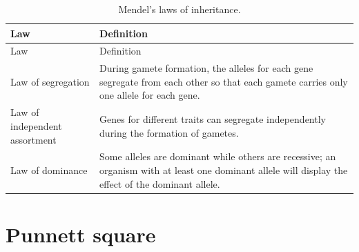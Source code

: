\documentclass[]{book}
\begin{document}
\begin{longtable}[]{@{}ll@{}}
\caption{\label{tab:mendel} Mendel's laws of inheritance.}\tabularnewline
\toprule
\begin{minipage}[b]{0.22\columnwidth}\raggedright
Law\strut
\end{minipage} & \begin{minipage}[b]{0.72\columnwidth}\raggedright
Definition\strut
\end{minipage}\tabularnewline
\midrule
\endfirsthead
\toprule
\begin{minipage}[b]{0.22\columnwidth}\raggedright
Law\strut
\end{minipage} & \begin{minipage}[b]{0.72\columnwidth}\raggedright
Definition\strut
\end{minipage}\tabularnewline
\midrule
\endhead
\begin{minipage}[t]{0.22\columnwidth}\raggedright
Law of segregation\strut
\end{minipage} & \begin{minipage}[t]{0.72\columnwidth}\raggedright
During gamete formation, the alleles for each gene segregate from each other so that each gamete carries only one allele for each gene.\strut
\end{minipage}\tabularnewline
\begin{minipage}[t]{0.22\columnwidth}\raggedright
Law of independent assortment\strut
\end{minipage} & \begin{minipage}[t]{0.72\columnwidth}\raggedright
Genes for different traits can segregate independently during the formation of gametes.\strut
\end{minipage}\tabularnewline
\begin{minipage}[t]{0.22\columnwidth}\raggedright
Law of dominance\strut
\end{minipage} & \begin{minipage}[t]{0.72\columnwidth}\raggedright
Some alleles are dominant while others are recessive; an organism with at least one dominant allele will display the effect of the dominant allele.\strut
\end{minipage}\tabularnewline
\bottomrule
\end{longtable}

\hypertarget{punnett-square}{%
\section{Punnett square}\label{punnett-square}}
\end{document}
